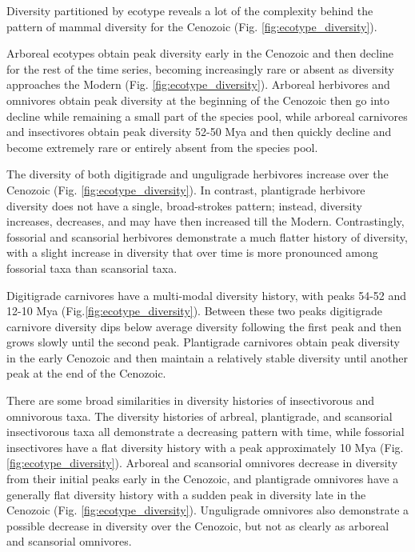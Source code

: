 \documentclass[12pt,letterpaper]{article}
\begin{document}
Diversity partitioned by ecotype reveals a lot of the complexity behind the pattern of mammal diversity for the Cenozoic (Fig. \ref{fig:ecotype_diversity}). 

Arboreal ecotypes obtain peak diversity early in the Cenozoic and then decline for the rest of the time series, becoming increasingly rare or absent as diversity approaches the Modern (Fig. \ref{fig:ecotype_diversity}). Arboreal herbivores and omnivores obtain peak diversity at the beginning of the Cenozoic then go into decline while remaining a small part of the species pool, while arboreal carnivores and insectivores obtain peak diversity 52-50 Mya and then quickly decline and become extremely rare or entirely absent from the species pool.

The diversity of both digitigrade and unguligrade herbivores increase over the Cenozoic (Fig. \ref{fig:ecotype_diversity}). In contrast, plantigrade herbivore diversity does not have a single, broad-strokes pattern; instead, diversity increases, decreases, and may have then increased till the Modern. Contrastingly, fossorial and scansorial herbivores demonstrate a much flatter history of diversity, with a slight increase in diversity that over time is more pronounced among fossorial taxa than scansorial taxa.

Digitigrade carnivores have a multi-modal diversity history, with peaks 54-52 and 12-10 Mya (Fig.\ref{fig:ecotype_diversity}). Between these two peaks digitigrade carnivore diversity dips below average diversity following the first peak and then grows slowly until the second peak. Plantigrade carnivores obtain peak diversity in the early Cenozoic and then maintain a relatively stable diversity until another peak at the end of the Cenozoic. 

There are some broad similarities in diversity histories of insectivorous and omnivorous taxa. The diversity histories of arbreal, plantigrade, and scansorial insectivorous taxa all demonstrate a decreasing pattern with time, while fossorial insectivores have a flat diversity history with a peak approximately 10 Mya (Fig. \ref{fig:ecotype_diversity}). Arboreal and scansorial omnivores decrease in diversity from their initial peaks early in the Cenozoic, and plantigrade omnivores have a generally flat diversity history with a sudden peak in diversity late in the Cenozoic (Fig. \ref{fig:ecotype_diversity}). Unguligrade omnivores also demonstrate a possible decrease in diversity over the Cenozoic, but not as clearly as arboreal and scansorial omnivores.
\end{document}
